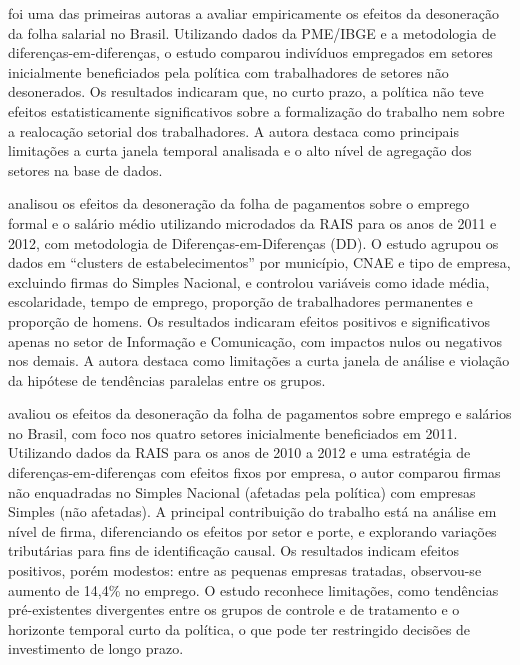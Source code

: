 \documentclass[12pt,a4paper,oneside]{article}
\begin{document}
		
		
		\citet{docarmo2012} foi uma das primeiras autoras a avaliar empiricamente os efeitos da desoneração da folha salarial no Brasil. Utilizando dados da PME/IBGE e a metodologia de diferenças-em-diferenças, o estudo comparou indivíduos empregados em setores inicialmente beneficiados pela política com trabalhadores de setores não desonerados. Os resultados indicaram que, no curto prazo, a política não teve efeitos estatisticamente significativos sobre a formalização do trabalho nem sobre a realocação setorial dos trabalhadores. A autora destaca como principais limitações a curta janela temporal analisada e o alto nível de agregação dos setores na base de dados.
		
		\citet{Dallava2014} analisou os efeitos da desoneração da folha de pagamentos sobre o emprego formal e o salário médio utilizando microdados da RAIS para os anos de 2011 e 2012, com metodologia de Diferenças-em-Diferenças (DD). O estudo agrupou os dados em “clusters de estabelecimentos” por município, CNAE e tipo de empresa, excluindo firmas do Simples Nacional, e controlou variáveis como idade média, escolaridade, tempo de emprego, proporção de trabalhadores permanentes e proporção de homens. Os resultados indicaram efeitos positivos e significativos apenas no setor de Informação e Comunicação, com impactos nulos ou negativos nos demais. A autora destaca como limitações a curta janela de análise e violação da hipótese de tendências paralelas entre os grupos.
		
		\citet{Scherer2015} avaliou os efeitos da desoneração da folha de pagamentos sobre emprego e salários no Brasil, com foco nos quatro setores inicialmente beneficiados em 2011. Utilizando dados da RAIS para os anos de 2010 a 2012 e uma estratégia de diferenças-em-diferenças com efeitos fixos por empresa, o autor comparou firmas não enquadradas no Simples Nacional (afetadas pela política) com empresas Simples (não afetadas).  A principal contribuição do trabalho está na análise em nível de firma, diferenciando os efeitos por setor e porte, e explorando variações tributárias para fins de identificação causal. Os resultados indicam efeitos positivos, porém modestos: entre as pequenas empresas tratadas, observou-se aumento de 14,4\% no emprego. O estudo reconhece limitações, como tendências pré-existentes divergentes entre os grupos de controle e de tratamento e o horizonte temporal curto da política, o que pode ter restringido decisões de investimento de longo prazo.
		
\end{document}

